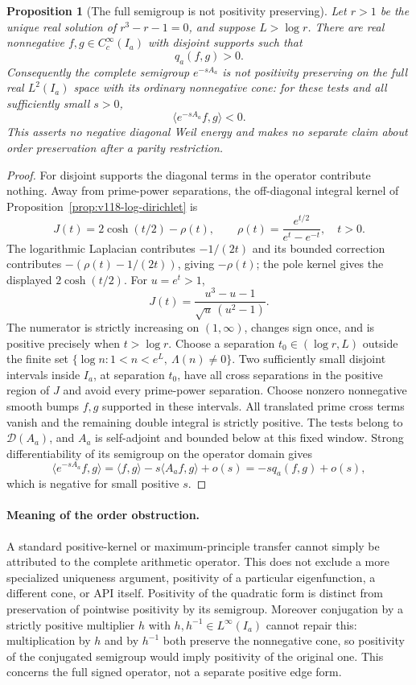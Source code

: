 \documentclass[11pt]{article}
\newtheorem{proposition}[theorem]{Proposition}
\theoremstyle{remark}
\begin{document}
\begin{proposition}[The full semigroup is not positivity preserving]
\label{prop:ns55-nonpositive-semigroup}
Let $r>1$ be the unique real solution of $r^3-r-1=0$, and suppose
$L>\log r$. There are real nonnegative
$f,g\in C_c^\infty(I_a)$ with disjoint supports such that
\begin{equation}\label{eq:ns55-positive-cross}
 q_a(f,g)>0.
\end{equation}
Consequently the complete semigroup $e^{-sA_a}$ is not positivity
preserving on the full real $L^2(I_a)$ space with its ordinary
nonnegative cone: for these tests and all sufficiently small $s>0$,
\[
 \langle e^{-sA_a}f,g\rangle<0.
\]
This asserts no negative diagonal Weil energy and makes no separate
claim about order preservation after a parity restriction.
\end{proposition}
\begin{proof}
For disjoint supports the diagonal terms in the operator contribute
nothing. Away from prime-power separations, the off-diagonal integral
kernel of Proposition~\ref{prop:v118-log-dirichlet} is
\[
 J(t)=2\cosh(t/2)-\rho(t),\qquad
 \rho(t)=\frac{e^{t/2}}{e^t-e^{-t}},\quad t>0.
\]
The logarithmic Laplacian contributes $-1/(2t)$ and its bounded
correction contributes $-(\rho(t)-1/(2t))$, giving $-\rho(t)$;
the pole kernel gives the displayed $2\cosh(t/2)$.
For $u=e^t>1$,
\[
 J(t)=\frac{u^3-u-1}{\sqrt u\,(u^2-1)}.
\]
The numerator is strictly increasing on $(1,\infty)$, changes sign
once, and is positive precisely when $t>\log r$.
Choose a separation $t_0\in(\log r,L)$ outside the finite set
$\{\log n:1<n<e^L,\ \Lambda(n)\ne0\}$. Two sufficiently small
disjoint intervals inside $I_a$, at separation $t_0$, have all
cross separations in the positive region of $J$ and avoid every
prime-power separation. Choose nonzero nonnegative smooth bumps
$f,g$ supported in these intervals. All translated prime cross
terms vanish and the remaining double integral is strictly positive.
The tests belong to $\mathcal D(A_a)$, and $A_a$ is self-adjoint
and bounded below at this fixed window. Strong differentiability
of its semigroup on the operator domain gives
\[
 \langle e^{-sA_a}f,g\rangle
 =\langle f,g\rangle-s\langle A_af,g\rangle+o(s)
 =-s q_a(f,g)+o(s),
\]
which is negative for small positive $s$.
\end{proof}

\paragraph{Meaning of the order obstruction.}
A standard positive-kernel or maximum-principle transfer cannot simply
be attributed to the complete arithmetic operator. This does not
exclude a more specialized uniqueness argument, positivity of a
particular eigenfunction, a different cone, or API itself.
Positivity of the quadratic form is distinct from preservation of
pointwise positivity by its semigroup. Moreover conjugation by a
strictly positive multiplier $h$ with $h,h^{-1}\in L^\infty(I_a)$
cannot repair this: multiplication by $h$ and by $h^{-1}$ both
preserve the nonnegative cone, so positivity of the conjugated
semigroup would imply positivity of the original one. This concerns
the full signed operator, not a separate positive edge form.
\end{document}

